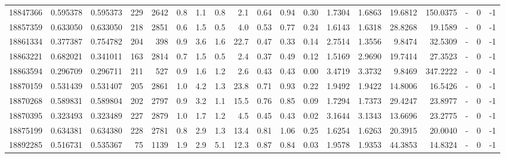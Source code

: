 \begin{tabular}{rrrrrrrrrrrrrrrrlrr}
  18847366 & 0.595378 &   0.595373 &  229 & 2642 &      0.8 &      1.1 &     0.8 &      2.1 &       0.64 &        0.94 &        0.30 &  1.7304 &  1.6863 &   19.6812 &  150.0375 &             - &        0 &         -1 \\
  18857359 & 0.633050 &   0.633050 &  218 & 2851 &      0.6 &      1.5 &     0.5 &      4.0 &       0.53 &        0.77 &        0.24 &  1.6143 &  1.6318 &   28.8268 &   19.1589 &             - &        0 &         -1 \\
  18861334 & 0.377387 &   0.754782 &  204 &  398 &      0.9 &      3.6 &     1.6 &     22.7 &       0.47 &        0.33 &        0.14 &  2.7514 &  1.3556 &    9.8474 &   32.5309 &             - &        0 &         -1 \\
  18863221 & 0.682021 &   0.341011 &  163 & 2814 &      0.7 &      1.5 &     0.5 &      2.4 &       0.37 &        0.49 &        0.12 &  1.5169 &  2.9690 &   19.7414 &   27.3523 &             - &        0 &         -1 \\
  18863594 & 0.296709 &   0.296711 &  211 &  527 &      0.9 &      1.6 &     1.2 &      2.6 &       0.43 &        0.43 &        0.00 &  3.4719 &  3.3732 &    9.8469 &  347.2222 &             - &        0 &         -1 \\
  18870159 & 0.531439 &   0.531407 &  205 & 2861 &      1.0 &      4.2 &     1.3 &     23.8 &       0.71 &        0.93 &        0.22 &  1.9492 &  1.9422 &   14.8006 &   16.5426 &             - &        0 &         -1 \\
  18870268 & 0.589831 &   0.589804 &  202 & 2797 &      0.9 &      3.2 &     1.1 &     15.5 &       0.76 &        0.85 &        0.09 &  1.7294 &  1.7373 &   29.4247 &   23.8977 &             - &        0 &         -1 \\
  18870395 & 0.323493 &   0.323489 &  227 & 2879 &      1.0 &      1.7 &     1.2 &      4.5 &       0.45 &        0.43 &        0.02 &  3.1644 &  3.1343 &   13.6696 &   23.2775 &             - &        0 &         -1 \\
  18875199 & 0.634381 &   0.634380 &  228 & 2781 &      0.8 &      2.9 &     1.3 &     13.4 &       0.81 &        1.06 &        0.25 &  1.6254 &  1.6263 &   20.3915 &   20.0040 &             - &        0 &         -1 \\
  18892285 & 0.516731 &   0.535367 &   75 & 1139 &      1.9 &      2.9 &     5.1 &     12.3 &       0.87 &        0.84 &        0.03 &  1.9578 &  1.9353 &   44.3853 &   14.8324 &             - &        0 &         -1 \\

\end{tabular}
